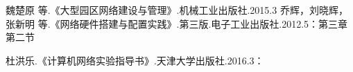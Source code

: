 \begin{thebibliography}{9}
魏楚原 等.《大型园区网络建设与管理》.机械工业出版社.2015.3 
乔辉，刘晓辉，张新明 等.《网络硬件搭建与配置实践》.第三版.电子工业出版社.2012.5：第三章第二节



杜洪乐.《计算机网络实验指导书》.天津大学出版社.2016.3：
\end{thebibliography}
\clearpage
